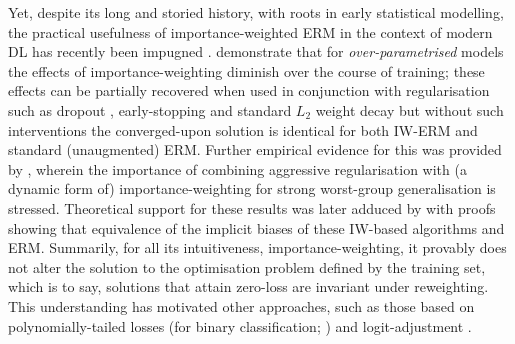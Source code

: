 Yet, despite its long and storied history, with roots in early statistical modelling, the practical
usefulness of importance-weighted \ac{ERM} in the context of modern \acf{DL} has recently been
impugned \citep{byrd2019effect, zhai2022understanding}.
%
\citet{byrd2019effect} demonstrate that for \emph{over-parametrised} models the effects of
importance-weighting diminish over the course of training; these effects can be partially recovered
when used in conjunction with regularisation such as dropout \citep{srivastava14dropout},
early-stopping and standard \(L_2\) weight decay but without such interventions the converged-upon
solution is identical for both \ac{IW}-\ac{ERM} and standard (unaugmented) \ac{ERM}. 
%
Further empirical evidence for this was provided by \citet{sagawa2019distributionally}, wherein the
importance of combining aggressive regularisation with (a dynamic form of) importance-weighting for
strong worst-group generalisation is stressed.
%
Theoretical support for these results was later adduced by \citet{zhai2022understanding} with proofs
showing that equivalence of the implicit biases of these \ac{IW}-based algorithms and \ac{ERM}.
%
Summarily, for all its intuitiveness, importance-weighting, it provably does not alter the solution
to the optimisation problem defined by the training set, which is to say, solutions that attain
zero-loss are invariant under reweighting.
%
This understanding has motivated other approaches, such as those based on polynomially-tailed
losses (for binary classification; \citealp{wang2021importance}) and logit-adjustment
\citep{menon2020long}.
%

